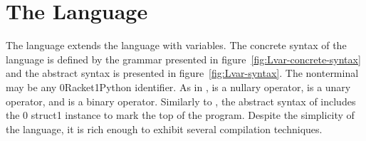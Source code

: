\documentclass[7x10]{TimesAPriori_MIT}%
\def\racketEd{0}
\def\pythonEd{1}
\def\edition{1}
\newcommand{\racket}[1]{{\if\edition\racketEd{#1}\fi}}
\newcommand{\pythonColor}[0]{}
\newcommand{\python}[1]{{\if\edition\pythonEd\pythonColor #1\fi}}
\numberwithin{theorem}{chapter}
\numberwithin{definition}{chapter}
\numberwithin{equation}{chapter}
\begin{document}
\section{The \LangVar{} Language}
\label{sec:s0}

The \LangVar{} language extends the \LangInt{} language with
variables.  The concrete syntax of the \LangVar{} language is defined
by the grammar presented in figure~\ref{fig:Lvar-concrete-syntax} and
the abstract syntax is presented in figure~\ref{fig:Lvar-syntax}.  The
nonterminal \Var{} may be any \racket{Racket}\python{Python}
identifier.  As in \LangInt{}, \READOP{} is a nullary operator,
\key{-} is a unary operator, and \key{+} is a binary operator.
Similarly to \LangInt{}, the abstract syntax of \LangVar{} includes the
\racket{ struct}\python{ instance} to mark
the top of the program.
Despite the simplicity of the \LangVar{} language, it is rich enough to
exhibit several compilation techniques.

\newcommand{\LvarGrammarRacket}{
  \begin{array}{rcl}
    \Exp &::=& \Var \MID \CLET{\Var}{\Exp}{\Exp}
  \end{array}
}
\newcommand{\LvarASTRacket}{
  \begin{array}{rcl}
    \Exp &::=& \VAR{\Var} \MID \LET{\Var}{\Exp}{\Exp} 
  \end{array}
}
\newcommand{\LvarGrammarPython}{
\begin{array}{rcl}
  \Exp &::=& \Var{} \\
  \Stmt &::=& \Var\mathop{\key{=}}\Exp
\end{array}
}
\newcommand{\LvarASTPython}{
  \begin{array}{rcl}
\Exp{} &::=& \VAR{\Var{}} \\
\Stmt{} &::=& \ASSIGN{\VAR{\Var}}{\Exp}
  \end{array}
}
  
\end{document}
